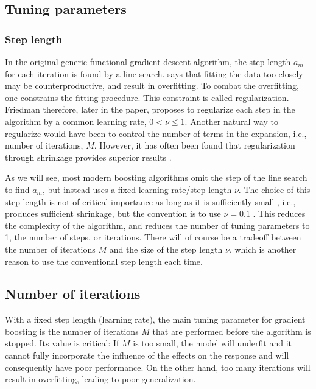 \subsection{Tuning parameters}
\subsubsection{Step length}
In the original generic functional gradient descent algorithm, the step length $a_m$ for each iteration is found by a line search.
\citet{friedman2001} says that fitting the data too closely may be counterproductive, and result in overfitting.
To combat the overfitting, one constrains the fitting procedure.
This constraint is called regularization.
Friedman therefore, later in the paper, proposes to regularize each step in the algorithm by a common learning rate, $0<\nu\leq1$.
Another natural way to regularize would have been to control the number of terms in the expansion, i.e., number of iterations, $M$.
However, it has often been found that regularization through shrinkage provides superior results \citep{copas1983}.

As we will see, most modern boosting algorithms omit the step of the line search to find $a_m$, but instead uses a fixed learning rate/step length $\nu$.  
The choice of this step length is not of critical importance as long as it is sufficiently small \citep{schmid-hothorn}, i.e., produces sufficient shrinkage, but the convention is to use $\nu=0.1$ \citep{mayr14a}.
This reduces the complexity of the algorithm, and reduces the number of tuning parameters to 1, the number of steps, or iterations.
There will of course be a tradeoff between the number of iterations $M$ and the size of the step length $\nu$, which is another reason to use the conventional step length each time.

\subsection{Number of iterations}\label{subsec:iterations}
With a fixed step length (learning rate), the main tuning parameter for gradient boosting is the number of iterations $M$ that are performed before the algorithm is stopped.
Its value is critical:
If $M$ is too small, the model will underfit and it cannot fully incorporate the influence of the effects on the response and will consequently have poor performance.
On the other hand, too many iterations will result in overfitting, leading to poor generalization.


